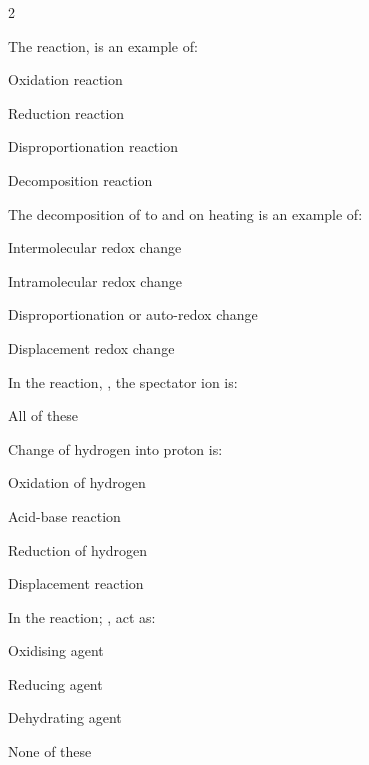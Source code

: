 \documentclass[10pt,a4paper]{article}
\begin{document}
\begin{multicols}{2}
\begin{questions}
\item The reaction,  is an example of:
\begin{options}
  \item Oxidation reaction
  \item Reduction reaction
  \item Disproportionation reaction
  \item Decomposition reaction
\end{options}

\item The decomposition of  to  and  on heating is an example of:
\begin{options}
  \item Intermolecular redox change
  \item Intramolecular redox change
  \item Disproportionation or auto-redox change
  \item Displacement redox change
\end{options}

\item In the reaction, , the spectator ion is:
\begin{options}
  \item {}
  \item {}
  \item {}
  \item All of these
\end{options}

\item Change of hydrogen into proton is:
\begin{options}
  \item Oxidation of hydrogen
  \item Acid-base reaction
  \item Reduction of hydrogen
  \item Displacement reaction
\end{options}

\item In the reaction; ,  act as:
\begin{options}
  \item Oxidising agent
  \item Reducing agent
  \item Dehydrating agent
  \item None of these
\end{options}

\end{questions}
\end{multicols}
\end{document}
